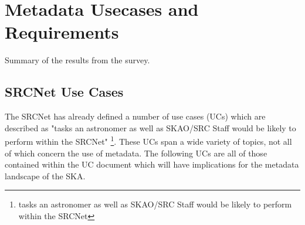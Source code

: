\section{Metadata Usecases and Requirements}\label{sec:reqs}

Summary of the results from the survey. 

\subsection{SRCNet Use Cases}

The SRCNet has already defined a number of use cases (UCs) which are described as "tasks an astronomer as well as SKAO/SRC Staff would be likely to perform within the
SRCNet" \footnote{tasks an astronomer as well as SKAO/SRC Staff would be likely to perform within the SRCNet}. 
These UCs span a wide variety of topics, not all of which concern the use of metadata.
The following UCs are all of those contained within the UC document which will have implications for the metadata landscape of the SKA. 
\\
